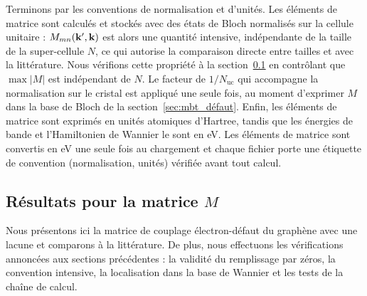 Terminons par les conventions de normalisation et d'unités. Les éléments de matrice sont calculés et stockés avec des états de Bloch normalisés sur la cellule unitaire : $M_{mn}(\mathbf{k}',\mathbf{k})$ est alors une quantité intensive, indépendante de la taille de la super-cellule $N$, ce qui autorise la comparaison directe entre tailles et avec la littérature. Nous vérifions cette propriété à la section~\ref{sec:M_results} en contrôlant que $\max|M|$ est indépendant de $N$. Le facteur de $1/N_\text{uc}$ qui accompagne la normalisation sur le cristal est appliqué une seule fois, au moment d'exprimer $M$ dans la base de Bloch de la section~\ref{sec:mbt_défaut}. Enfin, les éléments de matrice sont exprimés en unités atomiques d'Hartree, tandis que les énergies de bande et l'Hamiltonien de Wannier le sont en eV. Les éléments de matrice sont convertis en eV une seule fois au chargement et chaque fichier porte une étiquette de convention (normalisation, unités) vérifiée avant tout calcul.

\subsection{Résultats pour la matrice $M$}\label{sec:M_results}

Nous présentons ici la matrice de couplage électron-défaut du graphène avec une lacune et comparons à la littérature. De plus, nous effectuons les vérifications annoncées aux sections précédentes : la validité du remplissage par zéros, la convention intensive, la localisation dans la base de Wannier et les tests de la chaîne de calcul.


